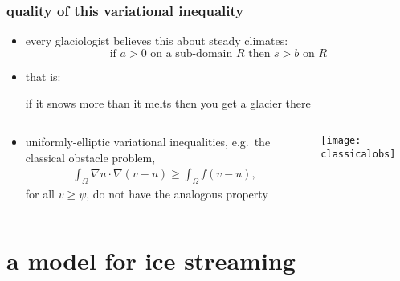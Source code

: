 \documentclass{beamer}
\begin{document}
\begin{frame}
  \frametitle{quality of this variational inequality} 

\begin{itemize}
\item every glaciologist believes this about steady climates:
	$$\text{if } a > 0 \text{ on a sub-domain } R \text{ then } s > b \text{ on } R$$
\item that is:
\begin{center}
 if it snows more than it melts then you get a glacier there
\end{center}
\end{itemize}

\begin{columns}
\begin{column}{0.6\textwidth}
\begin{itemize}
\small
\item uniformly-elliptic variational inequalities, e.g.~the classical obstacle problem,
\begin{align*}
\int_{\Omega}  \nabla u \cdot \nabla (v - u)  \ge  \int_{\Omega} f (v - u),
\end{align*}
for all $v\ge \psi$, do not have the analogous property
\end{itemize}
\end{column}
\begin{column}{0.4\textwidth}
\texttt{[image: classicalobs]}
\end{column}
\end{columns}
\end{frame}


\section[ice streams]{a model for ice streaming}
\end{document}
